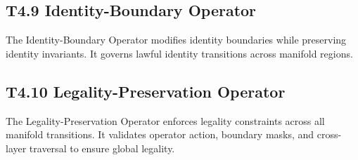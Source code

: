 \subsection{T4.9 Identity-Boundary Operator}
The Identity-Boundary Operator modifies identity boundaries while preserving
identity invariants. It governs lawful identity transitions across manifold
regions.

\subsection{T4.10 Legality-Preservation Operator}
The Legality-Preservation Operator enforces legality constraints across all
manifold transitions. It validates operator action, boundary masks, and
cross-layer traversal to ensure global legality.
